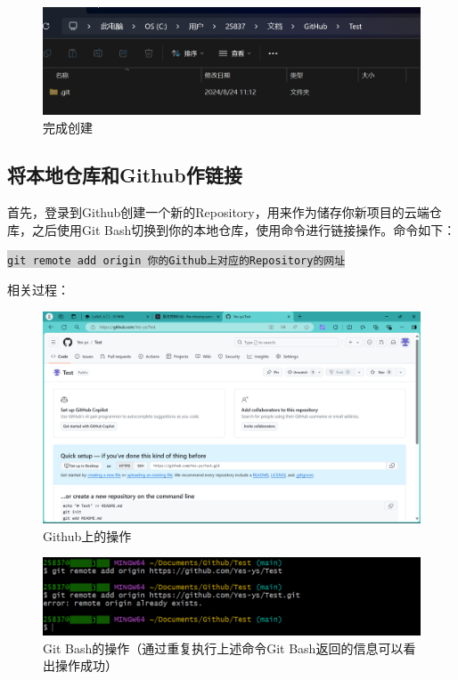 \documentclass[a4paper, 12pt]{article}
\begin{document}
\begin{figure}[h]
  \centering
  \includegraphics[width=1\textwidth]{im3}
  \caption{完成创建}
  \label{image-myimage}
\end{figure}

\clearpage

  \subsection{将本地仓库和Github作链接}

首先，登录到Github创建一个新的Repository，用来作为储存你新项目的云端仓库，之后使用Git Bash切换到你的本地仓库，使用命令进行链接操作。命令如下：

\colorbox{lightgray}{\texttt{git remote add origin 你的Github上对应的Repository的网址}}

相关过程：

\begin{figure}[h]
  \centering
  \includegraphics[width=1\textwidth]{im5}
  \caption{Github上的操作}
  \label{image-myimage}
\end{figure}

\begin{figure}[h]
  \centering
  \includegraphics[width=1\textwidth]{im4}
  \caption{Git Bash的操作（通过重复执行上述命令Git Bash返回的信息可以看出操作成功）}
  \label{image-myimage}
\end{figure}
\end{document}
